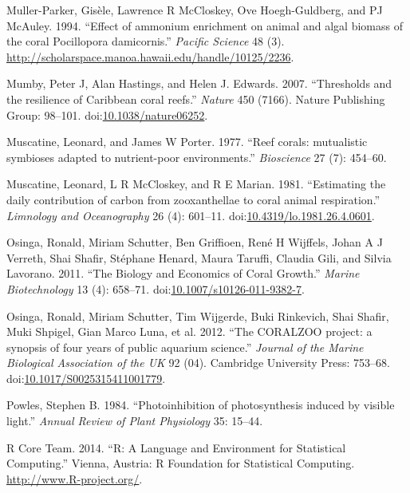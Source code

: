 \documentclass[]{elsarticle} %
\begin{document}
\hypertarget{ref-MullerParker:1994uo}{}
Muller-Parker, Gisèle, Lawrence R McCloskey, Ove Hoegh-Guldberg, and PJ
McAuley. 1994. ``Effect of ammonium enrichment on animal and algal
biomass of the coral Pocillopora damicornis.'' \emph{Pacific Science} 48
(3). \url{http://scholarspace.manoa.hawaii.edu/handle/10125/2236}.

\hypertarget{ref-Mumby:2007cr}{}
Mumby, Peter J, Alan Hastings, and Helen J. Edwards. 2007. ``Thresholds
and the resilience of Caribbean coral reefs.'' \emph{Nature} 450 (7166).
Nature Publishing Group: 98--101.
doi:\href{https://doi.org/10.1038/nature06252}{10.1038/nature06252}.

\hypertarget{ref-Muscatine:1977p4220}{}
Muscatine, Leonard, and James W Porter. 1977. ``Reef corals: mutualistic
symbioses adapted to nutrient-poor environments.'' \emph{Bioscience} 27
(7): 454--60.

\hypertarget{ref-Muscatine:1981jy}{}
Muscatine, Leonard, L R McCloskey, and R E Marian. 1981. ``Estimating
the daily contribution of carbon from zooxanthellae to coral animal
respiration.'' \emph{Limnology and Oceanography} 26 (4): 601--11.
doi:\href{https://doi.org/10.4319/lo.1981.26.4.0601}{10.4319/lo.1981.26.4.0601}.

\hypertarget{ref-Osinga:2011kq}{}
Osinga, Ronald, Miriam Schutter, Ben Griffioen, René H Wijffels, Johan A
J Verreth, Shai Shafir, Stéphane Henard, Maura Taruffi, Claudia Gili,
and Silvia Lavorano. 2011. ``The Biology and Economics of Coral
Growth.'' \emph{Marine Biotechnology} 13 (4): 658--71.
doi:\href{https://doi.org/10.1007/s10126-011-9382-7}{10.1007/s10126-011-9382-7}.

\hypertarget{ref-Osinga:2012is}{}
Osinga, Ronald, Miriam Schutter, Tim Wijgerde, Buki Rinkevich, Shai
Shafir, Muki Shpigel, Gian Marco Luna, et al. 2012. ``The CORALZOO
project: a synopsis of four years of public aquarium science.''
\emph{Journal of the Marine Biological Association of the UK} 92 (04).
Cambridge University Press: 753--68.
doi:\href{https://doi.org/10.1017/S0025315411001779}{10.1017/S0025315411001779}.

\hypertarget{ref-Powles:1984tm}{}
Powles, Stephen B. 1984. ``Photoinhibition of photosynthesis induced by
visible light.'' \emph{Annual Review of Plant Physiology} 35: 15--44.

\hypertarget{ref-RALanguageandEn:2014wf}{}
R Core Team. 2014. ``R: A Language and Environment for Statistical
Computing.'' Vienna, Austria: R Foundation for Statistical Computing.
\url{http://www.R-project.org/}.
\end{document}

